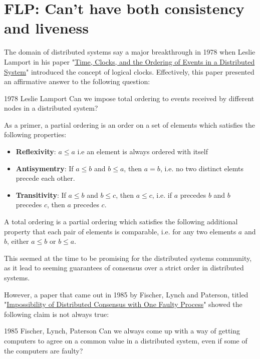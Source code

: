 \section{FLP: Can't have both consistency and liveness}


The domain of distributed systems say a major breakthrough in 1978 when Leslie Lamport in his paper "\href{https://amturing.acm.org/p558-lamport.pdf}{Time, Clocks, and the Ordering of Events in a Distributed System}" introduced the concept of logical clocks. Effectively, this paper presented an affirmative answer to the following question:

\begin{quotebox}{1978 Leslie Lamport}
    Can we impose total ordering to events received by different nodes in a distributed system?
\end{quotebox}

As a primer, a partial ordering is an order on a set of elements which satisfies the following properties:
\begin{itemize}
    \item \textbf{Reflexivity}: $a \leq a$ i.e an element is always ordered with itself
    \item \textbf{Antisymentry}: If $a \leq b$ and $b \leq a$, then $a = b$, i.e. no two distinct elemts precede each other.
    \item \textbf{Transitivity}: If $a \leq b$ and $b \leq c$, then $a \leq c$, i.e. if $a$ precedes $b$ and $b$ precedes $c$, then $a$ precedes $c$.
\end{itemize}

A total ordering is a partial ordering which satisfies the following additional property that each pair of elements is comparable, i.e. for any two elements $a$ and $b$, either $a \leq b$ or $b \leq a$.

This seemed at the time to be promising for the distributed systems community, as it lead to seeming guarantees of consensus over a strict order in distributed systems. 

However, a paper that came out in 1985 by Fischer, Lynch and Paterson, titled "\href{https://groups.csail.mit.edu/tds/papers/Lynch/jacm85.pdf}{Impossibility of Distributed Consensus with One Faulty Process}" showed the following claim is not always true: 

\begin{quotebox}{1985 Fischer, Lynch, Paterson}
    Can we always come up with a way of getting computers to agree on a common value in a distributed system, even if some of the computers are faulty?
\end{quotebox}

